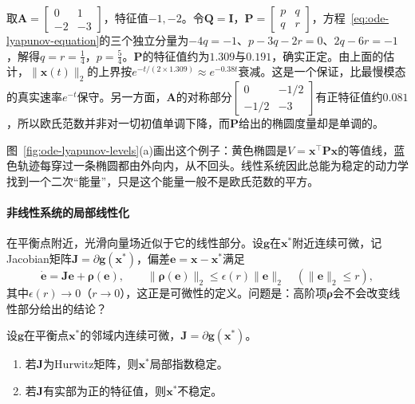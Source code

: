 \begin{example}[手算Lyapunov方程]
  \label{ex:ode-lyapunov-equation}
  取$\bm A=\begin{bmatrix}0&1\\-2&-3\end{bmatrix}$，特征值$-1,-2$。令$\bm Q=\bm I$，$\bm P=\begin{bmatrix}p&q\\q&r\end{bmatrix}$，方程~\eqref{eq:ode-lyapunov-equation}的三个独立分量为$-4q=-1$、$p-3q-2r=0$、$2q-6r=-1$，解得$q=r=\tfrac14$，$p=\tfrac54$。$\bm P$的特征值约为$1.309$与$0.191$，确实正定。由上面的估计，$\|\bm x(t)\|_2$的上界按$e^{-t/(2\times1.309)}\approx e^{-0.38t}$衰减。这是一个保证，比最慢模态的真实速率$e^{-t}$保守。另一方面，$\bm A$的对称部分$\begin{bmatrix}0&-1/2\\-1/2&-3\end{bmatrix}$有正特征值约$0.081$，所以欧氏范数并非对一切初值单调下降，而$\bm P$给出的椭圆度量却是单调的。
\end{example}

图~\ref{fig:ode-lyapunov-levels}(a)画出这个例子：黄色椭圆是$V=\bm x^\top\bm P\bm x$的等值线，蓝色轨迹每穿过一条椭圆都由外向内，从不回头。线性系统因此总能为稳定的动力学找到一个二次“能量”，只是这个能量一般不是欧氏范数的平方。

\paragraph{非线性系统的局部线性化}
在平衡点附近，光滑向量场近似于它的线性部分。设$\bm g$在$\bm x^\ast$附近连续可微，记Jacobian矩阵$\bm J=\partial\bm g(\bm x^\ast)$，偏差$\bm e=\bm x-\bm x^\ast$满足
\[
  \dot{\bm e}=\bm J\bm e+\bm\rho(\bm e),\qquad\|\bm\rho(\bm e)\|_2\leq\epsilon(r)\|\bm e\|_2\quad(\|\bm e\|_2\leq r),
\]
其中$\epsilon(r)\to0$（$r\to0$），这正是可微性的定义。问题是：高阶项$\bm\rho$会不会改变线性部分给出的结论？

\begin{theorem}[线性化判据]
  \label{thm:ode-linearization}
  设$\bm g$在平衡点$\bm x^\ast$的邻域内连续可微，$\bm J=\partial\bm g(\bm x^\ast)$。
  \begin{enumerate}
    \item 若$\bm J$为Hurwitz矩阵，则$\bm x^\ast$局部指数稳定。
    \item 若$\bm J$有实部为正的特征值，则$\bm x^\ast$不稳定。
  \end{enumerate}
\end{theorem}


